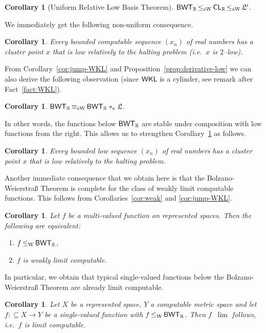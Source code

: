 \documentclass[a4paper]{amsart}
\def\IR{{\mathbb{R}}}
\def\Low{\mathfrak{L}}
\def\In{\subseteq}
\def\WKL{\text{\rm\sffamily WKL}}
\def\BWT{\text{\rm\sffamily BWT}}
\def\CL{\text{\rm\sffamily CL}}
\def\leqW{\mathop{\leq_{\mathrm{W}}}}
\def\leqSW{\mathop{\leq_{\mathrm{sW}}}}
\def\equivSW{\mathop{\equiv_{\mathrm{sW}}}}
\def\stars{*_{\rm s}\;\!}
\newtheorem{corollary}[theorem]{Corollary}
\theoremstyle{definition}
\begin{document}
\begin{corollary}[Uniform Relative Low Basis Theorem]
\label{cor:uniform-relative-low-basis}
$\BWT_\IR\leqSW\CL_\IR\leqSW\Low'$.
\end{corollary}

We immediately get the following non-uniform consequence.

\begin{corollary}
\label{cor:low-cluster}
Every bounded computable sequence $(x_n)$ of real numbers has a cluster point $x$
that is low relatively to the halting problem (i.e.\ $x$ is $2$--low).
\end{corollary}

From Corollary~\ref{cor:jump-WKL} and Proposition~\ref{prop:derivative-low} we can also derive 
the following observation (since $\WKL$ is a cylinder, see remark after Fact~\ref{fact:WKL}).

\begin{corollary} $\BWT_\IR\equivSW\BWT_\IR\stars\Low$.
\end{corollary}

In other words, the functions below $\BWT_\IR$ are stable under composition with low functions
from the right. This allows us to strengthen Corollary~\ref{cor:low-cluster} as follows.

\begin{corollary}
Every bounded low sequence $(x_n)$ of real numbers has a cluster point $x$ that is low
relatively to the halting problem.
\end{corollary}
 
Another immediate consequence that we obtain here is that the Bolzano-Weier\-stra\ss{} Theorem 
is complete for the class of weakly limit computable functions. This follows from
Corollaries~\ref{cor:weak} and \ref{cor:jump-WKL}.

\begin{corollary}
Let $f$ be a multi-valued function on represented spaces. 
Then the following are equivalent:
\begin{enumerate}
\item $f\leqW\BWT_{\IR}$,
\item $f$ is weakly limit computable.
\end{enumerate}
\end{corollary}

In particular, we obtain that typical single-valued functions below the Bolzano-Weierstra\ss{} Theorem
are already limit computable.

\begin{corollary}
\label{cor:single-valued-BWT}
Let $X$ be a represented space, $Y$ a computable metric space and let $f:\In X\to Y$ be a 
single-valued function with $f\leqW\BWT_\IR$. Then $f\leqW\lim$ follows, i.e.\ $f$ is limit computable.
\end{corollary}
\end{document}
